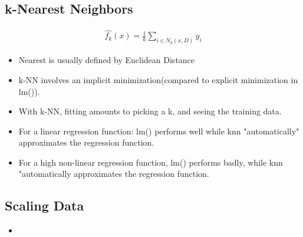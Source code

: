 \documentclass[12pt, oneside]{article}
\begin{document}
\subsection{k-Nearest Neighbors}
\begin{align*}
    \hat{f_k}(x) = \frac{1}{k}\sum_{i\in N_k(x,D)}y_i
\end{align*}
\begin{itemize}
    \item Nearest is usually defined by Euclidean Distance
    \item k-NN involves an implicit minimization(compared to explicit minimization in lm()).
    \item With k-NN, fitting amounts to picking a k, and seeing the training data.
    \item For a linear regression function: lm() performs well while knn "automatically" approximates the regression function.
    \item For a high non-linear regression function, lm() performs badly, while knn "automatically approximates the regression function.
\end{itemize}
\subsection{Scaling Data}
\begin{itemize}
    \item 
\end{itemize}
\end{document}
